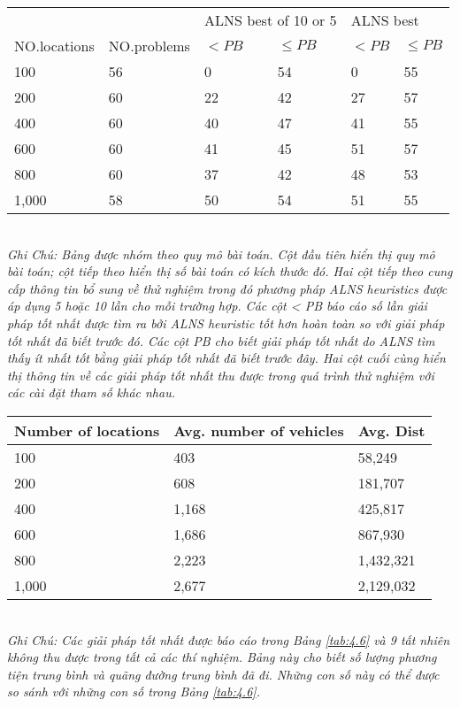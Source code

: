 
\begin{table}[caption={So sánh với những phương pháp tốt nhất hiện có}, label=tab:4.8]
    \begin{tabular}{llllll}
        \toprule
         & & \multicolumn{2}{l}{\footnotesize{ALNS best of 10 or 5}} & \multicolumn{2}{l}{\footnotesize{ALNS best}} \\
         \scriptsize{NO.locations} &\scriptsize{NO.problems} &\scriptsize{$< PB$}  &\scriptsize{$\leq PB$} &\scriptsize{$< PB$}  &\scriptsize{$\leq PB$} \\
         \midrule
         100   & 56 & 0  & 54 & 0  & 55 \\
         200   & 60 & 22 & 42 & 27 & 57 \\
         400   & 60 & 40 & 47 & 41 & 55 \\
         600   & 60 & 41 & 45 & 51 & 57 \\
         800   & 60 & 37 & 42 & 48 & 53 \\
         1,000 & 58 & 50 & 54 & 51 & 55  \\
    \end{tabular} \\
    \justify
    \textit{Ghi Chú: Bảng được nhóm theo quy mô bài toán. Cột đầu tiên hiển thị quy mô bài toán; cột tiếp theo hiển thị số bài toán có kích thước đó. Hai cột tiếp theo cung cấp thông tin bổ sung về thử nghiệm trong đó phương pháp ALNS heuristics được áp dụng 5 hoặc 10 lần cho mỗi trường hợp. Các cột < PB báo cáo số lần giải pháp tốt nhất được tìm ra bởi ALNS heuristic tốt hơn hoàn toàn so với giải pháp tốt nhất đã biết trước đó. Các cột PB cho biết giải pháp tốt nhất do ALNS tìm thấy ít nhất tốt bằng giải pháp tốt nhất đã biết trước đây. Hai cột cuối cùng hiển thị thông tin về các giải pháp tốt nhất thu được trong quá trình thử nghiệm với các cài đặt tham số khác nhau.}
\end{table}


\begin{table}[caption={Hiệu suất trung bình của ALNS Heuristic}, label=tab:4.9]
    \begin{tabular}{lll}
        \toprule
        Number of locations& Avg. number of vehicles & Avg. Dist \\ \midrule
    100 & 403 & 58,249   \\
    200 & 608 & 181,707   \\
    400 & 1,168 & 425,817  \\
    600 & 1,686 & 867,930   \\
    800 & 2,223 & 1,432,321  \\
    1,000 & 2,677 & 2,129,032 \\
    \end{tabular} \\
    \justify
    \textit{Ghi Chú: Các giải pháp tốt nhất được báo cáo trong Bảng \ref{tab:4.6} và 9 tất nhiên không thu được trong tất cả các thí nghiệm. Bảng này cho biết số lượng phương tiện trung bình và quãng đường trung bình đã đi. Những con số này có thể được so sánh với những con số trong Bảng \ref{tab:4.6}.}
\end{table}

